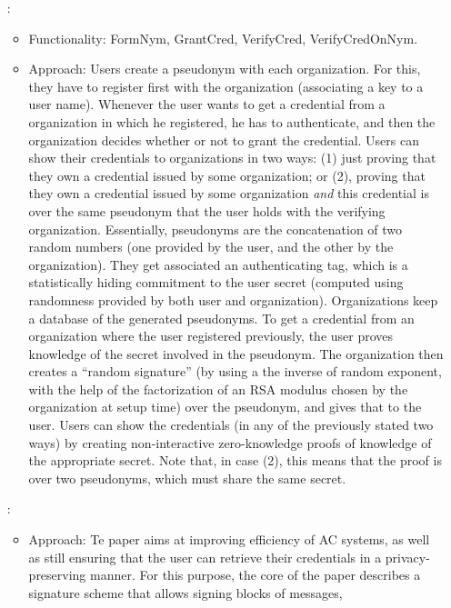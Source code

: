 \begin{enumerate}
\item[\cite{cl01}:]
  \begin{itemize}
  \item Functionality: FormNym, GrantCred, VerifyCred, VerifyCredOnNym.
  \item Approach: Users create a pseudonym with each organization. For this,
    they have to register first with the organization (associating a key to
    a user name). Whenever the user wants to get a credential from a organization
    in which he registered, he has to authenticate, and then the organization
    decides whether or not to grant the credential. Users can show their
    credentials to organizations in two ways: (1) just proving that they own a
    credential issued by some organization; or (2), proving that they own a
    credential issued by some organization \emph{and} this credential is over
    the same pseudonym that the user holds with the verifying organization.
    Essentially, pseudonyms are the concatenation of two random numbers (one
    provided by the user, and the other by the organization). They get
    associated an authenticating tag, which is a statistically hiding commitment
    to the user secret (computed using randomness provided by both user and
    organization). Organizations keep a database of the generated pseudonyms.
    To get a credential from an organization where the user registered
    previously, the user proves knowledge of the secret involved in the
    pseudonym. The organization then creates a ``random signature'' (by using a
    the inverse of random exponent, with the help of the factorization of an RSA
    modulus chosen by the organization at setup time) over the pseudonym, and
    gives that to the user. Users can show the credentials (in any of the
    previously stated two ways) by creating non-interactive zero-knowledge
    proofs of knowledge of the appropriate secret. Note that, in case (2),
    this means that the proof is over two pseudonyms, which must share the
    same secret.    
  \end{itemize}
\item[\cite{cl02}:]
  \begin{itemize}
  \item Approach: Te paper aims at improving efficiency of AC systems, as
    well as still ensuring that the user can retrieve their credentials in
    a privacy-preserving manner. For this purpose, the core of the paper
    describes a signature scheme that allows signing blocks of messages,

\end{itemize}
\end{enumerate}
